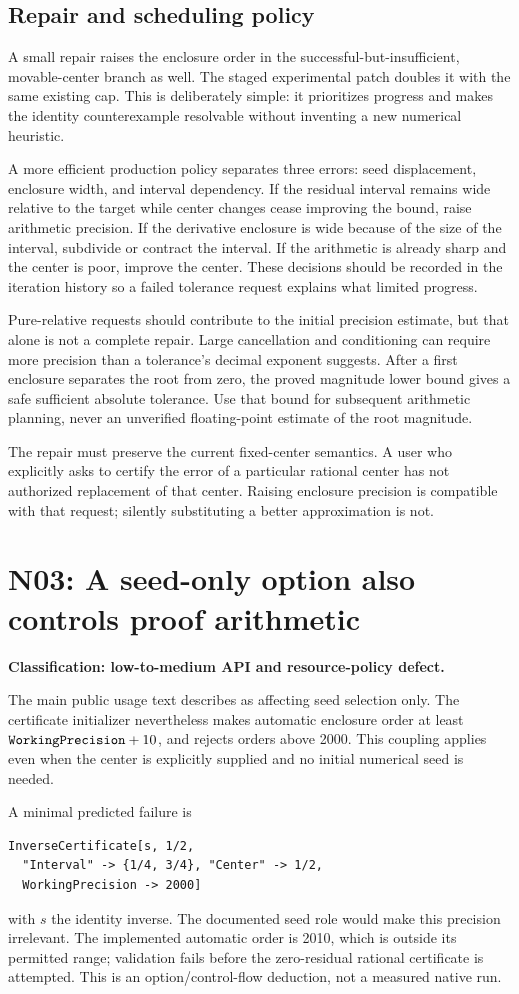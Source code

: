 \documentclass[11pt,a4paper]{article}
\newcommand{\code}[1]{\texttt{\detokenize{#1}}}
\newcommand{\finding}[3]{\Needspace{7\baselineskip}\section{#1: #2}\textbf{Classification: #3.}\par}
\begin{document}
\subsection{Repair and scheduling policy}
A small repair raises the enclosure order in the successful-but-insufficient, movable-center branch as well. The staged experimental patch doubles it with the same existing cap. This is deliberately simple: it prioritizes progress and makes the identity counterexample resolvable without inventing a new numerical heuristic.

A more efficient production policy separates three errors: seed displacement, enclosure width, and interval dependency. If the residual interval remains wide relative to the target while center changes cease improving the bound, raise arithmetic precision. If the derivative enclosure is wide because of the size of the interval, subdivide or contract the interval. If the arithmetic is already sharp and the center is poor, improve the center. These decisions should be recorded in the iteration history so a failed tolerance request explains what limited progress.

Pure-relative requests should contribute to the initial precision estimate, but that alone is not a complete repair. Large cancellation and conditioning can require more precision than a tolerance's decimal exponent suggests. After a first enclosure separates the root from zero, the proved magnitude lower bound gives a safe sufficient absolute tolerance. Use that bound for subsequent arithmetic planning, never an unverified floating-point estimate of the root magnitude.

The repair must preserve the current fixed-center semantics. A user who explicitly asks to certify the error of a particular rational center has not authorized replacement of that center. Raising enclosure precision is compatible with that request; silently substituting a better approximation is not.

\finding{N03}{A seed-only option also controls proof arithmetic}{low-to-medium API and resource-policy defect}

The main public usage text describes \code{WorkingPrecision} as affecting seed selection only. The certificate initializer nevertheless makes automatic enclosure order at least \(\code{WorkingPrecision}+10\), and rejects orders above 2000. This coupling applies even when the center is explicitly supplied and no initial numerical seed is needed.\cite{main,cert}

A minimal predicted failure is
\begin{lstlisting}
InverseCertificate[s, 1/2,
  "Interval" -> {1/4, 3/4}, "Center" -> 1/2,
  WorkingPrecision -> 2000]
\end{lstlisting}
with \(s\) the identity inverse. The documented seed role would make this precision irrelevant. The implemented automatic order is 2010, which is outside its permitted range; validation fails before the zero-residual rational certificate is attempted. This is an option/control-flow deduction, not a measured native run.
\end{document}
